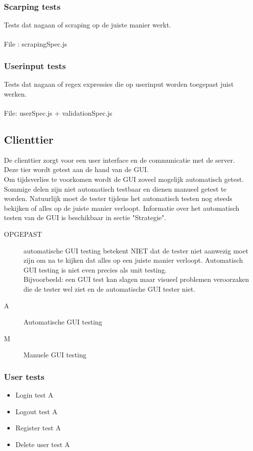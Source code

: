 \documentclass{article}
\begin{document}
\subsubsection{Scarping tests}
Tests dat nagaan of scraping op de juiste manier werkt.\\\\
File : scrapingSpec.js
\subsubsection{Userinput tests}
Tests dat nagaan of regex expressies die op userinput worden toegepast juist werken. \\\\
File: userSpec.js + validationSpec.js
\subsection{Clienttier}
De clienttier zorgt voor een user interface en de communicatie met de server. Deze tier wordt getest aan de hand van de GUI.\\
Om tijdsverlies te voorkomen wordt de GUI zoveel mogelijk automatisch getest. Sommige delen zijn niet automatisch testbaar en dienen manueel getest te worden. Natuurlijk moet de tester tijdens het automatisch testen nog steeds bekijken of alles op de juiste manier verloopt. Informatie over het automatisch testen van de GUI is beschikbaar in sectie "Strategie".\\
\begin{description}
\item[OPGEPAST] automatische GUI testing betekent NIET dat de tester niet aanwezig moet zijn om na te kijken dat alles op een juiste manier verloopt. Automatisch GUI testing is niet even precies als unit testing.\\
Bijvoorbeeld: een GUI test kan slagen maar visueel problemen veroorzaken die de tester wel ziet en de automatische GUI tester niet.
\end{description}

\begin{description}
\item[A] Automatische GUI testing
\item[M] Manuele GUI testing
\end{description}
\subsubsection{User tests}
\begin{itemize}
  \item Login test A
  \item Logout test A
  \item Register test A
  \item Delete user test A
\end{itemize}
\end{document}

